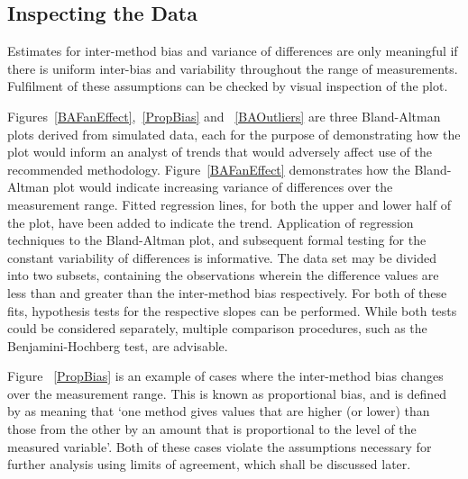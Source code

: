 \documentclass[12pt, a4paper]{report}
\theoremstyle{plain}
\theoremstyle{definition}
\theoremstyle{remark}
\begin{document}
	
	
	\subsection{Inspecting the Data}
	
	Estimates for inter-method bias and variance of differences are only meaningful if there is uniform inter-bias and variability throughout the range of measurements. Fulfilment of these assumptions can be checked by visual inspection of the plot.
	
	
	Figures~\ref{BAFanEffect},~\ref{PropBias} and ~\ref{BAOutliers} are three Bland-Altman plots derived from
	simulated data, each for the purpose of demonstrating how the plot would inform an analyst of trends that would adversely affect use of the recommended methodology. Figure~\ref{BAFanEffect} demonstrates how the Bland-Altman plot would indicate
	increasing variance of differences over the measurement range.
	Fitted regression lines, for both the upper and lower half of the	plot, have been added to indicate the trend. Application of regression techniques to the Bland-Altman plot, and subsequent formal testing for the constant variability of differences is informative. The data set may be divided into two subsets, containing the observations wherein the difference values are less than and greater than the inter-method bias respectively. For both of these fits, hypothesis tests for the respective slopes can be performed. While both tests could be considered separately, multiple comparison procedures, such as the Benjamini-Hochberg \citep{BH} test, are advisable.
	
	Figure ~\ref{PropBias} is an example
	of cases where the inter-method bias changes over the measurement range. This is known as proportional bias, and is defined by \citet{ludbrook97} as meaning that `one method gives
	values that are higher (or lower) than those from the other by an
	amount that is proportional to the level of the measured variable'. Both of these cases violate the assumptions necessary for further analysis using limits of agreement, which shall be discussed later. 
	
\end{document}
